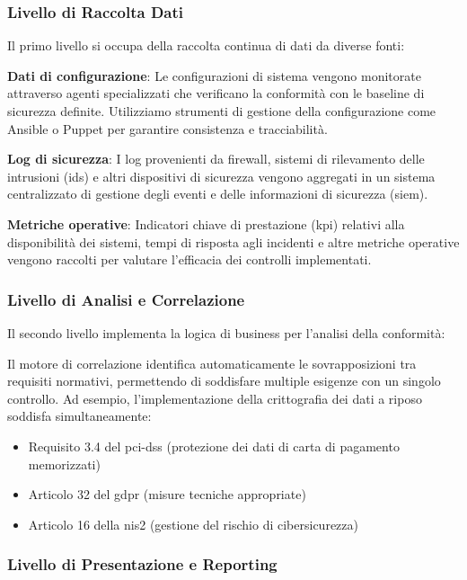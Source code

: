 \subsubsection{Livello di Raccolta Dati}

Il primo livello si occupa della raccolta continua di dati da diverse fonti:

\textbf{Dati di configurazione}: Le configurazioni di sistema vengono monitorate attraverso agenti specializzati che verificano la conformità con le baseline di sicurezza definite. Utilizziamo strumenti di gestione della configurazione come Ansible o Puppet per garantire consistenza e tracciabilità.

\textbf{Log di sicurezza}: I log provenienti da firewall, sistemi di rilevamento delle intrusioni (\gls{ids}) e altri dispositivi di sicurezza vengono aggregati in un sistema centralizzato di gestione degli eventi e delle informazioni di sicurezza (\gls{siem}).

\textbf{Metriche operative}: Indicatori chiave di prestazione (\gls{kpi}) relativi alla disponibilità dei sistemi, tempi di risposta agli incidenti e altre metriche operative vengono raccolti per valutare l'efficacia dei controlli implementati.

\subsubsection{Livello di Analisi e Correlazione}

Il secondo livello implementa la logica di business per l'analisi della conformità:

Il motore di correlazione identifica automaticamente le sovrapposizioni tra requisiti normativi, permettendo di soddisfare multiple esigenze con un singolo controllo. Ad esempio, l'implementazione della crittografia dei dati a riposo soddisfa simultaneamente:
\begin{itemize}
    \item Requisito 3.4 del \gls{pci-dss} (protezione dei dati di carta di pagamento memorizzati)
    \item Articolo 32 del \gls{gdpr} (misure tecniche appropriate)
    \item Articolo 16 della \gls{nis2} (gestione del rischio di cibersicurezza)
\end{itemize}

\subsubsection{Livello di Presentazione e Reporting}

